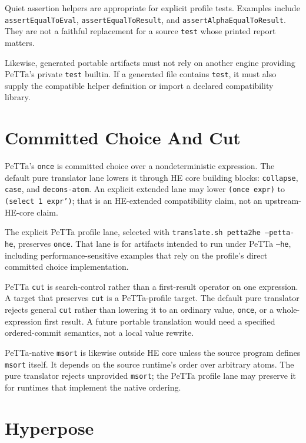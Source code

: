 \documentclass[11pt]{article}
\newcommand{\code}[1]{\texttt{#1}}
\newcommand{\HE}{\textup{HE}}
\newcommand{\PeTTa}{\textup{PeTTa}}
\begin{document}
Quiet assertion helpers are appropriate for explicit profile tests.  Examples
include \code{assertEqualToEval}, \code{assertEqualToResult}, and
\code{assertAlphaEqualToResult}.  They are not a faithful replacement for a
source \code{test} whose printed report matters.

Likewise, generated portable artifacts must not rely on another engine
providing \PeTTa{}'s private \code{test} builtin.  If a generated file contains
\code{test}, it must also supply the compatible helper definition or import a
declared compatibility library.

\section{Committed Choice And Cut}

\PeTTa{}'s \code{once} is committed choice over a nondeterministic expression.
The default pure translator lane lowers it through \HE{} core building blocks:
\code{collapse}, \code{case}, and \code{decons-atom}.  An explicit extended lane
may lower \code{(once expr)} to \code{(select 1 expr')}; that is an
\HE{}-extended compatibility claim, not an upstream-\HE{}-core claim.

The explicit \PeTTa{} profile lane, selected with
\code{translate.sh petta2he --petta-he}, preserves \code{once}.  That lane is
for artifacts intended to run under \PeTTa{} \code{--he}, including
performance-sensitive examples that rely on the profile's direct committed
choice implementation.

\PeTTa{} \code{cut} is search-control rather than a first-result operator on
one expression.  A target that preserves \code{cut} is a \PeTTa{}-profile
target.  The default pure translator rejects general \code{cut} rather than
lowering it to an ordinary value, \code{once}, or a whole-expression first
result.  A future portable translation would need a specified ordered-commit
semantics, not a local value rewrite.

\PeTTa{}-native \code{msort} is likewise outside \HE{} core unless the source
program defines \code{msort} itself.  It depends on the source runtime's order
over arbitrary atoms.  The pure translator rejects unprovided \code{msort};
the \PeTTa{} profile lane may preserve it for runtimes that implement the
native ordering.

\section{Hyperpose}
\end{document}
